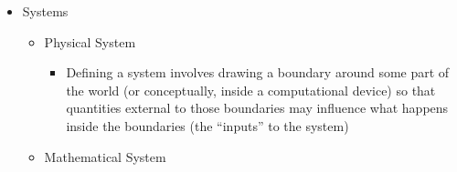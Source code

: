\begin{itemize}
\begin{itemize}
    \end{itemize}

  \item Systems

    \begin{itemize}

      \item Physical System

        \begin{itemize}

          \item Defining a system involves drawing a boundary around some part of the world (or conceptually, inside a computational device) so that quantities external to those boundaries may influence what happens inside the boundaries (the ``inputs'' to the system)

        \end{itemize}

      \item Mathematical System

    \end{itemize}

\end{itemize}



